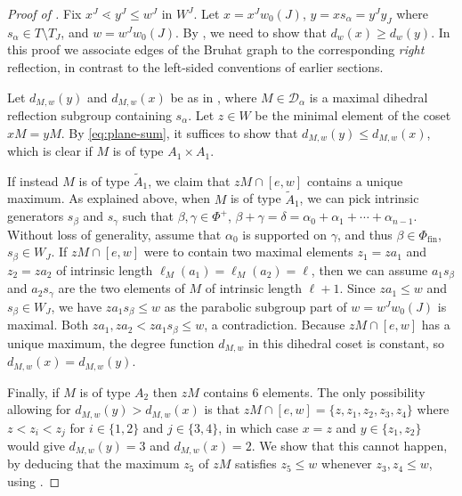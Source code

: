 \documentclass[11pt]{amsart}
\theoremstyle{definition}
\theoremstyle{remark}
\numberwithin{equation}{section}
\begin{document}
\begin{proof}[Proof of ]
Fix $x^J\lessdot y^J\leq w^J$ in $W^J$. Let $x=x^Jw_0(J)$, $y=xs_{\alpha}=y^Jy_J$ where $s_{\alpha}\in T\setminus T_J$, and $w=w^Jw_0(J)$. By , we need to show that $d_w(x)\geq d_w(y)$. In this proof we associate edges of the Bruhat graph to the corresponding \emph{right} reflection, in contrast to the left-sided conventions of earlier sections.

Let $d_{M,w}(y)$ and $d_{M,w}(x)$ be as in , where $M\in\mathcal{D}_{\alpha}$ is a maximal dihedral reflection subgroup containing $s_{\alpha}$. Let $z\in W$ be the minimal element of the coset $xM=yM$. By \eqref{eq:plane-sum}, it suffices to show that $d_{M,w}(y)\leq d_{M,w}(x)$, which is clear if $M$ is of type $A_1\times A_1$.

If instead $M$ is of type $\widetilde A_1$, we claim that $zM\cap [e,w]$ contains a unique maximum. As explained above, when $M$ is of type $\widetilde A_1$, we can pick intrinsic generators $s_{\beta}$ and $s_{\gamma}$ such that $\beta,\gamma\in\Phi^+$, $\beta+\gamma=\delta=\alpha_0+\alpha_1+\cdots+\alpha_{n-1}$. Without loss of generality, assume that $\alpha_0$ is supported on $\gamma$, and thus $\beta\in\Phi_{\mathrm{fin}}$, $s_{\beta}\in W_J$. If $zM\cap [e,w]$ were to contain two maximal elements $z_1=za_1$ and $z_2=za_2$ of intrinsic length $\ell_M(a_1)=\ell_M(a_2)=\ell$, then we can assume $a_1s_{\beta}$ and $a_2s_{\gamma}$ are the two elements of $M$ of intrinsic length $\ell+1$. Since $za_1\leq w$ and $s_{\beta}\in W_J$, we have $za_1s_{\beta}\leq w$ as the parabolic subgroup part of $w=w^Jw_0(J)$ is maximal. Both $za_1,za_2< za_1s_{\beta}\leq w$, a contradiction. Because $zM\cap [e,w]$ has a unique maximum, the degree function $d_{M,w}$ in this dihedral coset is constant, so $d_{M,w}(x)=d_{M,w}(y)$.

Finally, if $M$ is of type $A_2$ then $zM$ contains $6$ elements. The only possibility allowing for $d_{M,w}(y)>d_{M,w}(x)$ is that $zM\cap[e,w]=\{z,z_1,z_2,z_3,z_4\}$ where $z< z_i< z_j$ for $i\in\{1,2\}$ and $j\in\{3,4\}$, in which case $x=z$ and $y\in\{z_1,z_2\}$ would give $d_{M,w}(y)=3$ and $d_{M,w}(x)=2$. We show that this cannot happen, by deducing that the maximum $z_5$ of $zM$ satisfies $z_5\leq w$ whenever $z_3,z_4\leq w$, using .


\end{proof}
\end{document}
